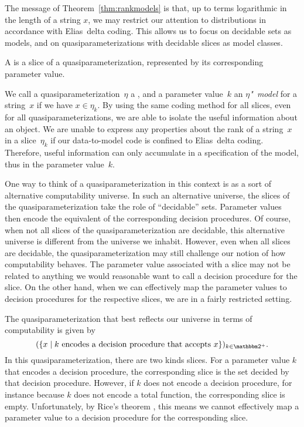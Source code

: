 The message of Theorem~\ref{thm:rankmodels} is that, up to terms logarithmic in the length of a string $x$, we may restrict our attention to distributions in accordance with Elias~delta coding.
This allows us to focus on decidable sets as models, and on quasiparameterizations with decidable slices as model classes.
\begin{definition}
  A  is a slice of a quasiparameterization, represented by its corresponding parameter value.
\end{definition}

We call a quasiparameterization~$\eta$ a , and a parameter value~$k$ an \emph{$\eta$"~model} for a string~$x$ if we have $x \in \eta_k$.
By using the same coding method for all slices, even for all quasiparameterizations, we are able to isolate the useful information about an object.
We are unable to express any properties about the rank of a string~$x$ in a slice~$\eta_k$ if our data-to-model code is confined to Elias~delta coding.
Therefore, useful information can only accumulate in a specification of the model, thus in the parameter value~$k$.

One way to think of a quasiparameterization in this context is as a sort of alternative computability universe.
In such an alternative universe, the slices of the quasiparameterization take the role of \enquote{decidable} sets.
Parameter values then encode the equivalent of the corresponding decision procedures.
Of course, when not all slices of the quasiparameterization are decidable, this alternative universe is different from the universe we inhabit.
However, even when all slices are decidable, the quasiparameterization may still challenge our notion of how computability behaves.
The parameter value associated with a slice may not be related to anything we would reasonable want to call a decision procedure for the slice.
On the other hand, when we can effectively map the parameter values to decision procedures for the respective slices, we are in a fairly restricted setting.
\begin{example}
  The quasiparameterization that best reflects our universe in terms of computability is given by
  \begin{equation}
  \label{eq:quasi_decision}
    (\{x \st \text{$k$ encodes a decision procedure that accepts $x$}\})_{k \in \binary^+}.
  \end{equation}
  In this quasiparameterization, there are two kinds slices.
  For a parameter value $k$ that encodes a decision procedure, the corresponding slice is the set decided by that decision procedure.
  However, if $k$ does not encode a decision procedure, for instance because $k$ does not encode a total function, the corresponding slice is empty.
  Unfortunately, by Rice's theorem \parencite{rice1953classes}, this means we cannot effectively map a parameter value to a decision procedure for the corresponding slice.
\end{example}

